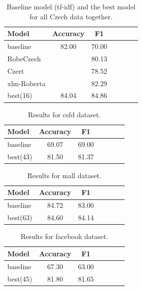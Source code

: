 \begin{table}[!h]
\centering
  \begin{tabular}{|l||c|c|c||c|c|c|}
  \hline
    Model & Accuracy & F1 \\ \hline \hline
    baseline & 82.00 & 70.00  \\ \hline
    RobeCzech &  & 80.13 \\ \hline
    Czert & & 78.52 \\ \hline
    xlm-Roberta && 82.29 \\ \hline
    best(16) & 84.04 & 84.86 \\ \hline
  \end{tabular}
  \caption{ Baseline model (tf-idf) and the best model for all Czech data together.} %
  \label{tab:res_czech}
\end{table}

\begin{table}[!h]
\centering
  \begin{tabular}{|l||c|c|c||c|c|c|}
  \hline
    Model & Accuracy & F1 \\ \hline \hline
    baseline & 69.07 & 69.00 \\ \hline
    best(43) & 81.50 & 81.37 \\ \hline
  \end{tabular}
  \caption{ Results for csfd dataset.} %
  \label{tab:res_csfd}
\end{table}
\begin{table}[!h]
\centering
  \begin{tabular}{|l||c|c|c||c|c|c|}
  \hline
    Model & Accuracy & F1 \\ \hline \hline
    baseline & 84.72& 83.00 \\ \hline
    best(63) & 84.60 & 84.14 \\ \hline
  \end{tabular}
  \caption{Results for mall dataset.} %
  \label{tab:res_mall}
\end{table}
\begin{table}[!h]
\centering
  \begin{tabular}{|l||c|c|c||c|c|c|}
  \hline
    Model & Accuracy & F1 \\ \hline \hline
    baseline & 67.30 & 63.00 \\ \hline
    best(45) & 81.80 & 81.65 \\ \hline
  \end{tabular}
  \caption{ Results for facebook dataset.} %
  \label{tab:res_facebook}
\end{table}


